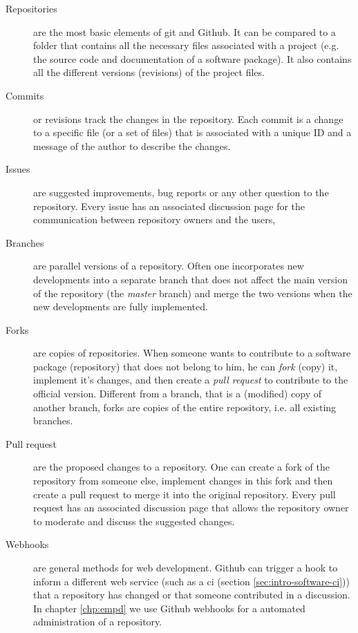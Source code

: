 \begin{refsection}
\begin{description}
	\item[Repositories] are the most basic elements of git and Github. It can be compared to a folder that contains all the necessary files associated with a project (e.g. the source code and documentation of a software package). It also contains all the different versions (revisions) of the project files.
	\item[Commits] or revisions track the changes in the repository. Each commit is a change to a specific file (or a set of files) that is associated with a unique ID and a message of the author to describe the changes.
	\item[Issues] are suggested improvements, bug reports or any other question to the repository. Every issue has an associated discussion page for the communication between repository owners and the users,
	\item[Branches] are parallel versions of a repository. Often one incorporates new developments into a separate branch that does not affect the main version of the repository (the \textit{master} branch) and merge the two versions when the new developments are fully implemented.
	\item[Forks] are copies of repositories. When someone wants to contribute to a software package (repository) that does not belong to him, he can \textit{fork} (copy) it, implement it's changes, and then create a \textit{pull request} to contribute to the official version. Different from a branch, that is a (modified) copy of another branch, forks are copies of the entire repository, i.e. all existing branches.
	\item[Pull request] are the proposed changes to a repository. One can create a fork of the repository from someone else, implement changes in this fork and then create a pull request to merge it into the original repository. Every pull request has an associated discussion page that allows the repository owner to moderate and discuss the suggested changes.
	\item[Webhooks] are general methods for web development. Github can trigger a hook to inform a different web service (such as a \gls{ci} (section \ref{sec:intro-software-ci})) that a repository has changed or that someone contributed in a discussion. In chapter \ref{chp:empd} we use Github webhooks for a automated administration of a repository.
\end{description}



\end{refsection}
